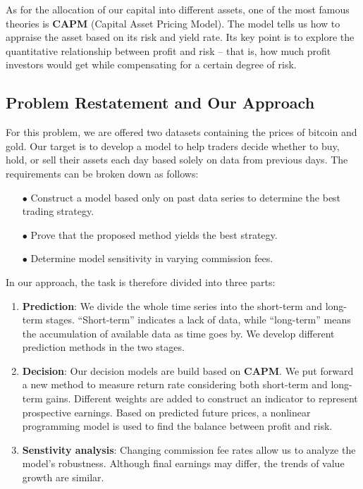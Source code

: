 \documentclass{mcmthesis}
\begin{document}
	As for the allocation of our capital into different assets, one of the most famous theories is \textbf{CAPM} (Capital Asset Pricing Model). The model tells us how to appraise the asset based on its risk and yield rate. Its key point is to explore the quantitative relationship between profit and risk -- that is, how much profit investors would get while compensating for a certain degree of risk. 
	
	\subsection{Problem Restatement and Our Approach}
	
	For this problem, we are offered two datasets containing the prices of bitcoin and gold. Our target is to develop a model to help traders decide whether to buy, hold, or sell their assets each day based solely on data from previous days. The requirements can be broken down as follows:
	\begin{enumerate}
		\item[$\bullet$] Construct a model based only on past data series to determine the best trading strategy. 
		\item[$\bullet$] Prove that the proposed method yields the best strategy.
		\item[$\bullet$] Determine model sensitivity in varying commission fees. 
	\end{enumerate}
	
	In our approach, the task is therefore divided into three parts: 
	\begin{enumerate}
		\item \textbf{Prediction}: We divide the whole time series into the short-term and long-term stages. ``Short-term'' indicates a lack of data, while ``long-term'' means the accumulation of available data as time goes by. We develop different prediction methods in the two stages.
		\item \textbf{Decision}: Our decision models are build based on \textbf{CAPM}. We put forward a new method to measure return rate considering both short-term and long-term gains. Different weights are added to construct an indicator to represent prospective earnings. Based on predicted future prices, a nonlinear programming model is used to find the balance between profit and risk.
		\item \textbf{Senstivity analysis}: Changing commission fee rates allow us to analyze the model's robustness. Although final earnings may differ, the trends of value growth are similar. 
	\end{enumerate}
\end{document}

